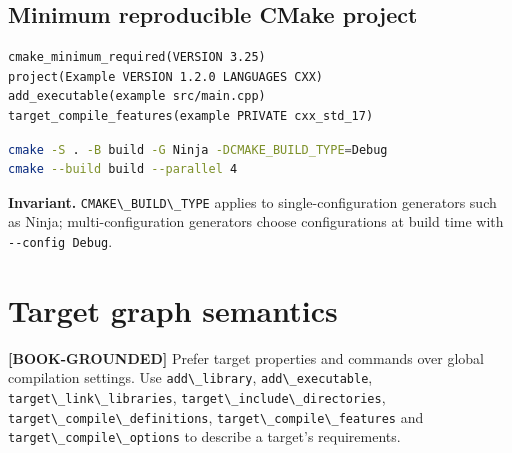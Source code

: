 \documentclass[11pt,letterpaper,oneside]{report}
\providecommand{\passthrough}[1]{#1}
\begin{document}
\section{Minimum reproducible CMake
project}\label{minimum-reproducible-cmake-project}

\begin{lstlisting}
cmake_minimum_required(VERSION 3.25)
project(Example VERSION 1.2.0 LANGUAGES CXX)
add_executable(example src/main.cpp)
target_compile_features(example PRIVATE cxx_std_17)
\end{lstlisting}

\begin{lstlisting}[language=sh]
cmake -S . -B build -G Ninja -DCMAKE_BUILD_TYPE=Debug
cmake --build build --parallel 4
\end{lstlisting}

\textbf{Invariant.} \passthrough{\lstinline!CMAKE\_BUILD\_TYPE!} applies
to single-configuration generators such as Ninja; multi-configuration
generators choose configurations at build time with
\passthrough{\lstinline!--config Debug!}.

\chapter{Target graph semantics}\label{target-graph-semantics}

\textbf{{[}BOOK-GROUNDED{]}} Prefer target properties and commands over
global compilation settings. Use \passthrough{\lstinline!add\_library!},
\passthrough{\lstinline!add\_executable!},
\passthrough{\lstinline!target\_link\_libraries!},
\passthrough{\lstinline!target\_include\_directories!},
\passthrough{\lstinline!target\_compile\_definitions!},
\passthrough{\lstinline!target\_compile\_features!} and
\passthrough{\lstinline!target\_compile\_options!} to describe a
target's requirements.
\end{document}
